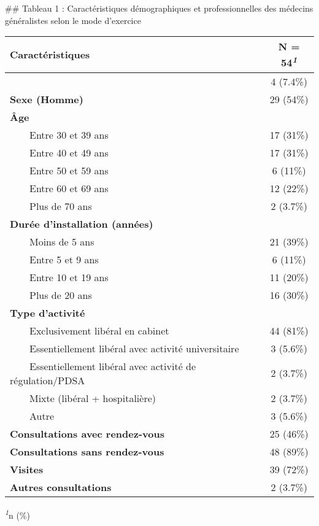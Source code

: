 \documentclass[
]{article}
\begin{document}
\hfill\break
\hfill\break
\#\# Tableau 1 : Caractéristiques démographiques et professionnelles des
médecins généralistes selon le mode d'exercice

\begin{table}[t]
\fontsize{12.0pt}{14.4pt}\selectfont
\begin{tabular*}{\linewidth}{@{\extracolsep{\fill}}lc}
\toprule
\textbf{Caractéristiques} & \textbf{N = 54}\textsuperscript{\textit{1}} \\ 
\midrule\addlinespace[2.5pt]
{\bfseries Connaissance du réseau MCS} & 4 (7.4\%) \\ 
{\bfseries Sexe (Homme)} & 29 (54\%) \\ 
{\bfseries Âge} &  \\ 
    Entre 30 et 39 ans & 17 (31\%) \\ 
    Entre 40 et 49 ans & 17 (31\%) \\ 
    Entre 50 et 59 ans & 6 (11\%) \\ 
    Entre 60 et 69 ans & 12 (22\%) \\ 
    Plus de 70 ans & 2 (3.7\%) \\ 
{\bfseries Durée d'installation (années)} &  \\ 
    Moins de 5 ans & 21 (39\%) \\ 
    Entre 5 et 9 ans & 6 (11\%) \\ 
    Entre 10 et 19 ans & 11 (20\%) \\ 
    Plus de 20 ans & 16 (30\%) \\ 
{\bfseries Type d'activité} &  \\ 
    Exclusivement libéral en cabinet & 44 (81\%) \\ 
    Essentiellement libéral avec activité universitaire & 3 (5.6\%) \\ 
    Essentiellement libéral avec activité de régulation/PDSA & 2 (3.7\%) \\ 
    Mixte (libéral + hospitalière) & 2 (3.7\%) \\ 
    Autre & 3 (5.6\%) \\ 
{\bfseries Consultations avec rendez-vous} & 25 (46\%) \\ 
{\bfseries Consultations sans rendez-vous} & 48 (89\%) \\ 
{\bfseries Visites} & 39 (72\%) \\ 
{\bfseries Autres consultations} & 2 (3.7\%) \\ 
\bottomrule
\end{tabular*}
\begin{minipage}{\linewidth}
\textsuperscript{\textit{1}}n (\%)\\
\end{minipage}
\end{table}
\end{document}
